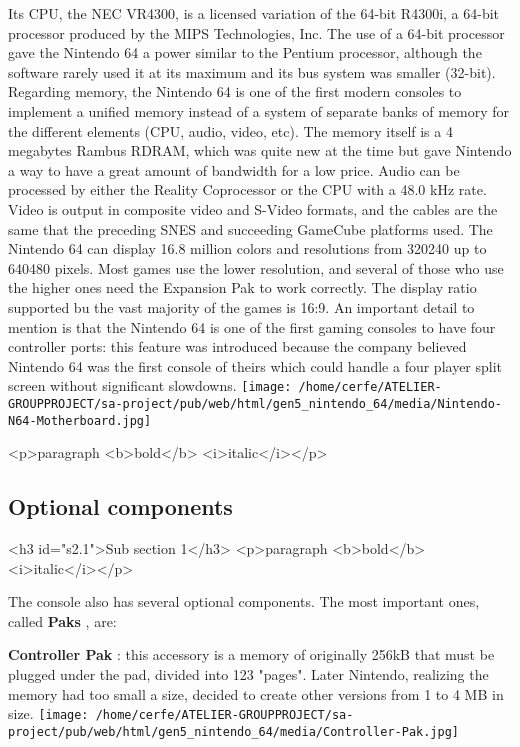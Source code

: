 \documentclass[a4paper,10pt]{book}
\begin{document}
          Its CPU, the NEC VR4300, is a licensed variation of the 64-bit R4300i, a 64-bit processor produced by the MIPS Technologies, Inc. The use of a 64-bit processor gave the Nintendo 64 a power similar to the Pentium processor, although the software rarely used it at its maximum and its bus system was smaller (32-bit). Regarding memory, the Nintendo 64 is one of the first modern consoles to implement a unified memory instead of a system of separate banks of memory for the different elements (CPU, audio, video, etc). 
          The memory itself is a 4 megabytes Rambus RDRAM, which was quite new at the time but gave Nintendo a way to have a great amount of bandwidth for a low price. 
          Audio can be processed by either the Reality Coprocessor or the CPU with a 48.0 kHz rate. Video is output in composite video and S-Video formats, and the cables are the same that the preceding SNES and succeeding GameCube platforms used. 
          The Nintendo 64 can display 16.8 million colors and resolutions from 320240 up to 640480 pixels. Most games use the lower resolution, and several of those who use the higher ones need the Expansion Pak to work correctly. The display ratio supported bu the vast majority of the games is 16:9. 
          An important detail to mention is that the Nintendo 64 is one of the first gaming consoles to have four controller ports: this feature was introduced because the company believed Nintendo 64 was the first console of theirs which could handle a four player split screen without significant slowdowns. 
 \texttt{[image: /home/cerfe/ATELIER-GROUPPROJECT/sa-project/pub/web/html/gen5\_nintendo\_64/media/Nintendo-N64-Motherboard.jpg]}
 
 <p>paragraph <b>bold</b> <i>italic</i></p> 
 \subsection{Optional components }
 <h3 id="s2.1">Sub section 1</h3>
        <p>paragraph <b>bold</b> <i>italic</i></p> 
 
          The console also has several optional components. The most important ones, called  \textbf{Paks } , are:
           
 \textbf{Controller Pak } : this accessory is a memory of originally 256kB that must be plugged under the pad, divided into 123 "pages". Later Nintendo, realizing the memory had too small a size, decided to create other versions from 1 to 4 MB in size. 
 \texttt{[image: /home/cerfe/ATELIER-GROUPPROJECT/sa-project/pub/web/html/gen5\_nintendo\_64/media/Controller-Pak.jpg]}
 
\end{document}
